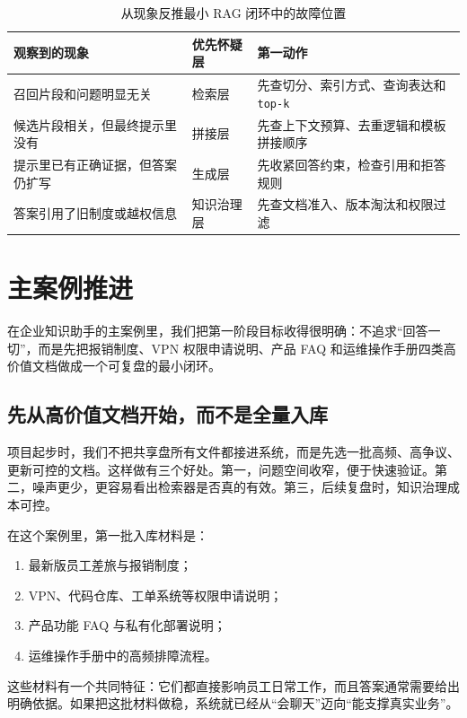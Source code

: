 \begin{table}[H]
\centering
\small
\begin{tabularx}{\textwidth}{>{\raggedright\arraybackslash}p{3cm}>{\raggedright\arraybackslash}p{3cm}>{\raggedright\arraybackslash}X}
\toprule
\textbf{观察到的现象} & \textbf{优先怀疑层} & \textbf{第一动作} \\
\midrule
召回片段和问题明显无关 & 检索层 & 先查切分、索引方式、查询表达和 \texttt{top-k} \\
候选片段相关，但最终提示里没有 & 拼接层 & 先查上下文预算、去重逻辑和模板拼接顺序 \\
提示里已有正确证据，但答案仍扩写 & 生成层 & 先收紧回答约束，检查引用和拒答规则 \\
答案引用了旧制度或越权信息 & 知识治理层 & 先查文档准入、版本淘汰和权限过滤 \\
\bottomrule
\end{tabularx}
\caption{从现象反推最小 RAG 闭环中的故障位置}
\label{tab:rag-routing}
\end{table}

\section{主案例推进}
在企业知识助手的主案例里，我们把第一阶段目标收得很明确：不追求“回答一切”，而是先把报销制度、VPN 权限申请说明、产品 FAQ 和运维操作手册四类高价值文档做成一个可复盘的最小闭环。

\subsection{先从高价值文档开始，而不是全量入库}
项目起步时，我们不把共享盘所有文件都接进系统，而是先选一批高频、高争议、更新可控的文档。这样做有三个好处。第一，问题空间收窄，便于快速验证。第二，噪声更少，更容易看出检索器是否真的有效。第三，后续复盘时，知识治理成本可控。

在这个案例里，第一批入库材料是：
\begin{enumerate}
  \item 最新版员工差旅与报销制度；
  \item VPN、代码仓库、工单系统等权限申请说明；
  \item 产品功能 FAQ 与私有化部署说明；
  \item 运维操作手册中的高频排障流程。
\end{enumerate}

这些材料有一个共同特征：它们都直接影响员工日常工作，而且答案通常需要给出明确依据。如果把这批材料做稳，系统就已经从“会聊天”迈向“能支撑真实业务”。


